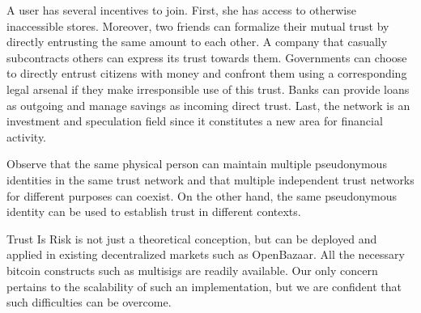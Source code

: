   A user has several incentives to join. First, she has access to otherwise inaccessible stores. Moreover, two friends can
  formalize their mutual trust by directly entrusting the same amount to each other. A company that casually subcontracts
  others can express its trust towards them. Governments can choose to directly entrust citizens with money and confront them
  using a corresponding legal arsenal if they make irresponsible use of this trust. Banks can provide loans as outgoing and
  manage savings as incoming direct trust. Last, the network is an investment and speculation field since it constitutes a new
  area for financial activity.

  Observe that the same physical person can maintain multiple pseudonymous identities in the same trust network and that
  multiple independent trust networks for different purposes can coexist. \ifdefined\proceedings \else On the other hand, the
  same pseudonymous identity can be used to establish trust in different contexts.\fi

  Trust Is Risk is not just a theoretical conception, but can be deployed and applied in existing decentralized markets such
  as OpenBazaar. All the necessary bitcoin constructs such as multisigs are readily available. Our only concern pertains to
  the scalability of such an implementation, but we are confident that such difficulties can be overcome.

